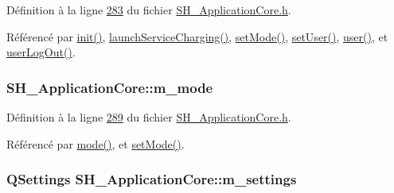 Définition à la ligne \hyperlink{SH__ApplicationCore_8h_source_l00283}{283} du fichier \hyperlink{SH__ApplicationCore_8h_source}{S\-H\-\_\-\-Application\-Core.\-h}.



Référencé par \hyperlink{classSH__ApplicationCore_acc4f20b555300706bc08424c71c6bf02}{init()}, \hyperlink{classSH__ApplicationCore_a74af071d9fefb1f0c3373e6501d04d62}{launch\-Service\-Charging()}, \hyperlink{classSH__ApplicationCore_a2bfe19528b27831332559d5d2cd24d25}{set\-Mode()}, \hyperlink{classSH__ApplicationCore_a2dd5c029a2ea348f1dfd0a60dea476e4}{set\-User()}, \hyperlink{classSH__ApplicationCore_a57fa0d6b5fd5f4a02f8a129ee470697b}{user()}, et \hyperlink{classSH__ApplicationCore_a3603a68faa57edb8722f9d1b67767368}{user\-Log\-Out()}.

\hypertarget{classSH__ApplicationCore_ab2bb2bdb19e4969dee699e0d4ae33e25}{
\subsubsection[{m\-\_\-mode}]{\setlength{\rightskip}{0pt plus 5cm}S\-H\-\_\-\-Application\-Core\-::m\-\_\-mode\hspace{0.3cm}{\ttfamily [private]}}}\label{classSH__ApplicationCore_ab2bb2bdb19e4969dee699e0d4ae33e25}


Définition à la ligne \hyperlink{SH__ApplicationCore_8h_source_l00289}{289} du fichier \hyperlink{SH__ApplicationCore_8h_source}{S\-H\-\_\-\-Application\-Core.\-h}.



Référencé par \hyperlink{classSH__ApplicationCore_a5d9ecb0e578e78d84591e36dccdf3d07}{mode()}, et \hyperlink{classSH__ApplicationCore_a2bfe19528b27831332559d5d2cd24d25}{set\-Mode()}.

\hypertarget{classSH__ApplicationCore_a26684dd6552b4aea5860de641a326774}{
\subsubsection[{m\-\_\-settings}]{\setlength{\rightskip}{0pt plus 5cm}Q\-Settings S\-H\-\_\-\-Application\-Core\-::m\-\_\-settings\hspace{0.3cm}{\ttfamily [private]}}}\label{classSH__ApplicationCore_a26684dd6552b4aea5860de641a326774}


